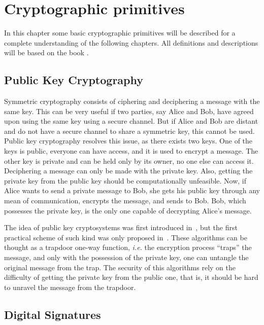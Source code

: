 \documentclass{ufsctex/ufsctex}
\begin{document}
\chapter{Cryptographic primitives}

In this chapter some basic cryptographic primitives will be described for a
complete understanding of the following chapters. All definitions and
descriptions will be based on the book \cite{stinson2005cryptography}.

\section{Public Key Cryptography}

Symmetric cryptography consists of ciphering and deciphering a message with the
same key. This can be very useful if two parties, say Alice and Bob, have
agreed upon using the same key using a secure channel. But if Alice and Bob are
distant and do not have a secure channel to share a symmetric key, this cannot
be used. Public key cryptography resolves this issue, as there exists two keys.
One of the keys is public, everyone can have access, and it is used to encrypt
a message. The other key is private and can be held only by its owner, no one
else can access it. Deciphering a message can only be made with the private
key. Also, getting the private key from the public key should be
computationally unfeasible. Now, if Alice wants to send a private message to
Bob, she gets his public key through any mean of communication, encrypts the
message, and sends to Bob. Bob, which possesses the private key, is the only
one capable of decrypting Alice's message.

The idea of public key cryptosystems was first introduced
in~\cite{diffie1976new}, but the first practical scheme of such kind was only
proposed in~\cite{rivest1977digital}. These algorithms can be thought as a
trapdoor one-way function, \textit{i.e.} the encryption process ``traps'' the
message, and only with the possession of the private key, one can untangle the
original message from the trap. The security of this algorithms rely on the
difficulty of getting the private key from the public one, that is, it should
be hard to unravel the message from the trapdoor.

\section{Digital Signatures}
\end{document}
